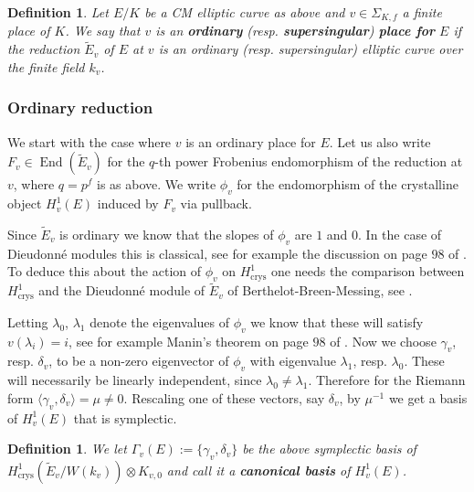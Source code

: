 \documentclass[12pt,twoside,a4paper]{article}
\theoremstyle{plain}%
\newtheorem{definition}[theorem]{Definition} %
\DeclareMathOperator{\End}{End}
\DeclareMathOperator{\crys}{crys}
\begin{document}
	\begin{definition}Let $E/K$ be a CM elliptic curve as above and $v\in\Sigma_{K,f}$ a finite place of $K$. We say that $v$ is an \textbf{ordinary} (resp. \textbf{supersingular}) \textbf{place for }$E$ if the reduction $\tilde{E}_v$ of $E$ at $v$ is an ordinary (resp. supersingular) elliptic curve over the finite field $k_v$.\end{definition}
	
	\subsubsection{Ordinary reduction}\label{section:ordredbases}
	
We start with the case where $v$ is an ordinary place for $E$. Let us also write $F_v\in \End(\tilde{E}_v)$ for the $q$-th power Frobenius endomorphism of the reduction at $v$, where $q=p^f$ is as above. We write $\phi_{v}$ for the endomorphism of the crystalline object $H^1_v(E)$ induced by $F_v$ via pullback. 
	
	Since $\tilde{E}_v$ is ordinary we know that the slopes of $\phi_v$ are $1$ and $0$. In the case of Dieudonn\'e modules this is classical, see for example the discussion on page $98$ of \cite{demazure}. To deduce this about the action of $\phi_v$ on $H^1_{\crys}$ one needs the comparison between $H^1_{\crys}$ and the Dieudonn\'e module of $\tilde{E}_v$ of Berthelot-Breen-Messing, see \cite{berbreenmessing}.
	
	Letting $\lambda_0$, $\lambda_1$ denote the eigenvalues of $\phi_{v}$ we know that these will satisfy $v(\lambda_i)=i$, see for example Manin's theorem on page $98$ of \cite{demazure}. Now we choose $\gamma_v$, resp. $\delta_v$, to be a non-zero eigenvector of $\phi_v$ with eigenvalue $\lambda_1$, resp. $\lambda_0$. These will necessarily be linearly independent, since $\lambda_0\neq  \lambda_1$. Therefore for the Riemann form $\langle\gamma_v,\delta_v\rangle=\mu\neq 0$. Rescaling one of these vectors, say $\delta_v$, by $\mu^{-1}$ we get a basis of $H^1_{v}(E)$ that is symplectic. 
	
	\begin{definition}\label{defcanord}
		We let $\Gamma_v(E):=\{\gamma_v,\delta_v\}$ be the above symplectic basis of $H^1_{\crys}(\tilde{E}_{v}/W(k_v))\otimes K_{v,0}$ and call it a \textbf{canonical basis }of $H^1_v(E)$.
	\end{definition}
	
\end{document}
